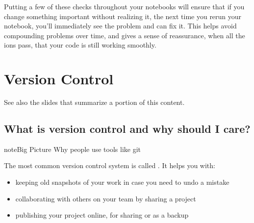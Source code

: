 \documentclass[letterpaper,10pt,english]{jupyterBook}
\begin{document}
\begin{sphinxVerbatim}[commandchars=\\\{\}]
     
 \PYG{p}{[}\PYG{p}{]}  
\end{sphinxVerbatim}

\sphinxAtStartPar
Putting a few of these checks throughout your notebooks will ensure that if you change something important without realizing it, the next time you re\sphinxhyphen{}run your notebook, you’ll immediately see the problem and can fix it.  This helps avoid compounding problems over time, and gives a sense of reassurance, when all the ions pass, that your code is still working smoothly.


\chapter{Version Control}
\label{\detokenize{chapter-8-version-control:version-control}}\label{\detokenize{chapter-8-version-control::doc}}
\sphinxAtStartPar
See also the slides that summarize a portion of this content.


\section{What is version control and why should I care?}
\label{\detokenize{chapter-8-version-control:what-is-version-control-and-why-should-i-care}}
\begin{sphinxadmonition}{note}{Big Picture \sphinxhyphen{} Why people use tools like git}

\sphinxAtStartPar
The most common version control system is called .  It helps you with:
\begin{itemize}
\item {} 
\sphinxAtStartPar
keeping old snapshots of your work in case you need to undo a mistake

\item {} 
\sphinxAtStartPar
collaborating with others on your team by sharing a project

\item {} 
\sphinxAtStartPar
publishing your project online, for sharing or as a backup

\end{itemize}
\end{sphinxadmonition}
\end{document}
